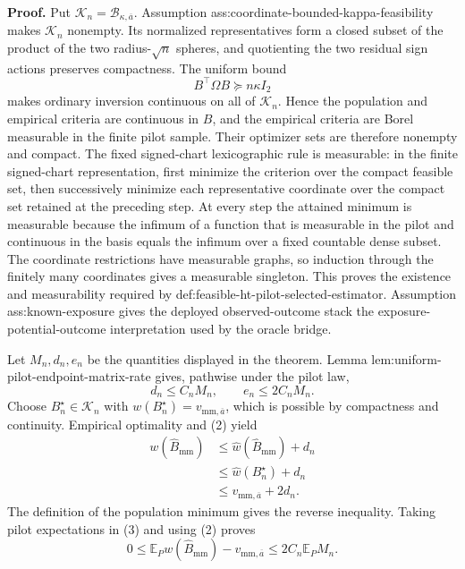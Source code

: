 \textbf{Proof.}
Put \(\mathcal K_n=\mathcal B_{\kappa,\overline a}\).  Assumption ass:coordinate-bounded-kappa-feasibility makes \(\mathcal K_n\) nonempty.  Its normalized representatives form a closed subset of the product of the two radius-\(\sqrt n\) spheres, and quotienting the two residual sign actions preserves compactness.  The uniform bound
\[
B^{\top}\Omega B\succeq n\kappa I_2
\tag{1}
\]
makes ordinary inversion continuous on all of \(\mathcal K_n\).  Hence the population and empirical criteria are continuous in \(B\), and the empirical criteria are Borel measurable in the finite pilot sample.  Their optimizer sets are therefore nonempty and compact.  The fixed signed-chart lexicographic rule is measurable: in the finite signed-chart representation, first minimize the criterion over the compact feasible set, then successively minimize each representative coordinate over the compact set retained at the preceding step.  At every step the attained minimum is measurable because the infimum of a function that is measurable in the pilot and continuous in the basis equals the infimum over a fixed countable dense subset.  The coordinate restrictions have measurable graphs, so induction through the finitely many coordinates gives a measurable singleton.  This proves the existence and measurability required by def:feasible-ht-pilot-selected-estimator.  Assumption ass:known-exposure gives the deployed observed-outcome stack the exposure-potential-outcome interpretation used by the oracle bridge.

Let \(M_n,d_n,e_n\) be the quantities displayed in the theorem.  Lemma lem:uniform-pilot-endpoint-matrix-rate gives, pathwise under the pilot law,
\[
d_n\le C_nM_n,
\qquad
e_n\le2C_nM_n.
\tag{2}
\]
Choose \(B_n^\star\in\mathcal K_n\) with \(w(B_n^\star)=v_{\mathrm{mm},\overline a}\), which is possible by compactness and continuity.  Empirical optimality and (2) yield
\[
\begin{aligned}
w(\widehat B_{\mathrm{mm}})
&\le \widehat w(\widehat B_{\mathrm{mm}})+d_n\\
&\le \widehat w(B_n^\star)+d_n\\
&\le v_{\mathrm{mm},\overline a}+2d_n.
\end{aligned}
\tag{3}
\]
The definition of the population minimum gives the reverse inequality.  Taking pilot expectations in (3) and using (2) proves
\[
0\le
\mathbb E_Pw(\widehat B_{\mathrm{mm}})-v_{\mathrm{mm},\overline a}
\le2C_n\mathbb E_PM_n.
\tag{4}
\]

